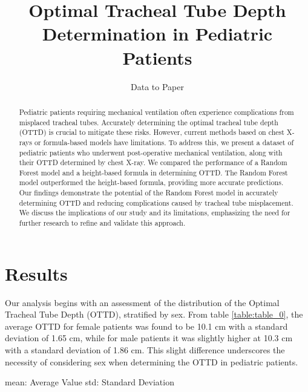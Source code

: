 \documentclass[11pt]{article}
\title{Optimal Tracheal Tube Depth Determination in Pediatric Patients}
\author{Data to Paper}
\begin{document}
\maketitle
\begin{abstract}
Pediatric patients requiring mechanical ventilation often experience complications from misplaced tracheal tubes. Accurately determining the optimal tracheal tube depth (OTTD) is crucial to mitigate these risks. However, current methods based on chest X-rays or formula-based models have limitations. To address this, we present a dataset of pediatric patients who underwent post-operative mechanical ventilation, along with their OTTD determined by chest X-ray. We compared the performance of a Random Forest model and a height-based formula in determining OTTD. The Random Forest model outperformed the height-based formula, providing more accurate predictions. Our findings demonstrate the potential of the Random Forest model in accurately determining OTTD and reducing complications caused by tracheal tube misplacement. We discuss the implications of our study and its limitations, emphasizing the need for further research to refine and validate this approach.
\end{abstract}
\section*{Results}

Our analysis begins with an assessment of the distribution of the Optimal Tracheal Tube Depth (OTTD), stratified by sex. From table \ref{table:table_0}, the average OTTD for female patients was found to be 10.1 cm with a standard deviation of 1.65 cm, while for male patients it was slightly higher at 10.3 cm with a standard deviation of 1.86 cm. This slight difference underscores the necessity of considering sex when determining the OTTD in pediatric patients.

\begin{table}[h]
\caption{Descriptive statistics of OTTD stratified by sex}
\label{table:table_0}
\begin{threeparttable}
\renewcommand{\TPTminimum}{\linewidth}
\begin{tablenotes}
\footnotesize
\item mean: Average Value
std: Standard Deviation
\end{tablenotes}
\end{threeparttable}
\end{table}
\end{document}
